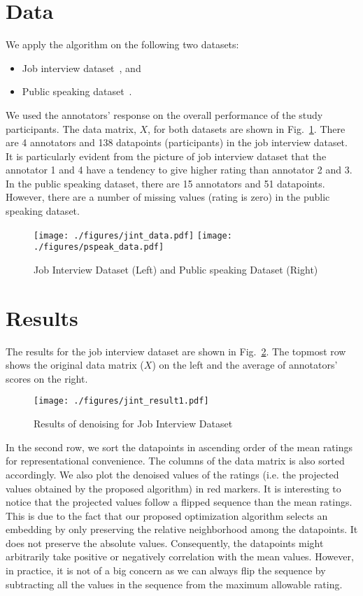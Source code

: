 \documentclass{article} \usepackage{nips14submit_e,times}
\begin{document}
\section{Data}
We apply the algorithm on the following two datasets:
\begin{itemize}
\item Job interview dataset~\cite{Hoque2013}, and
\item Public speaking dataset~\cite{Tanveer2015}.
\end{itemize}
We used the annotators' response on the overall performance of the study participants. The data matrix, $X$, for both datasets are shown in Fig.~\ref{Fig:datasets}. There are 4 annotators and 138 datapoints (participants) in the job interview dataset. It is particularly evident from the picture of job interview dataset that the annotator 1 and 4 have a tendency to give higher rating than annotator 2 and 3.  In the public speaking dataset, there are 15 annotators and 51 datapoints. However, there are a number of missing values (rating is zero) in the public speaking dataset. 
\begin{figure}
\centering
\texttt{[image: ./figures/jint\_data.pdf]}
\texttt{[image: ./figures/pspeak\_data.pdf]}\caption{Job Interview Dataset (Left) and Public speaking Dataset (Right)}\label{Fig:datasets}
\end{figure}

\section{Results}
The results for the job interview dataset are shown in Fig.~\ref{Fig:jint_result}. The topmost row shows the original data matrix ($X$) on the left and the average of annotators' scores on the right.
\begin{figure}
\centering
\texttt{[image: ./figures/jint\_result1.pdf]}
\caption{Results of denoising for Job Interview Dataset}\label{Fig:jint_result}
\end{figure}

In the second row, we sort the datapoints in ascending order of the mean ratings for representational convenience. The columns of the data matrix is also sorted accordingly. We also plot the denoised values of the ratings (i.e. the projected values obtained by the proposed algorithm) in red markers. It is interesting to notice that the projected values follow a flipped sequence than the mean ratings. This is due to the fact that our proposed optimization algorithm selects an embedding by only preserving the relative neighborhood among the datapoints. It does not preserve the absolute values. Consequently, the datapoints might arbitrarily take positive or negatively correlation with the mean values. However, in practice, it is not of a big concern as we can always flip the sequence by subtracting all the values in the sequence from the maximum allowable rating.
\end{document}
